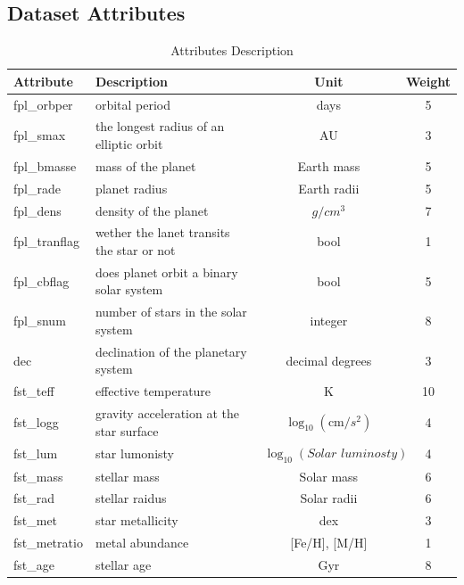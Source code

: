 \documentclass[12p]{article}
\begin{document}
\begin{landscape}
    \section{Dataset Attributes}
    \begin{table}[!h]\centering
        \caption{Attributes Description}
        \label{tab:att_desc}
        \begin{tabular}{|l l c c |}\hline
            Attribute         & Description                                         & Unit          & Weight \\ \hline\hline
            fpl\_orbper      & orbital period                                     & days            & 5 \\ \hline
            fpl\_smax        & the longest radius of an elliptic orbit    & AU             &3 \\ \hline
            fpl\_bmasse    & mass of the planet                              & Earth mass & 5 \\ \hline
            fpl\_rade         & planet radius                                       & Earth radii    & 5 \\ \hline
            fpl\_dens        & density of the planet                            & $g/cm^3$  & 7 \\ \hline
            fpl\_tranflag    & wether the lanet transits the star or not & bool          & 1 \\ \hline
            fpl\_cbflag      & does planet orbit a binary solar system  & bool           & 5 \\ \hline
            fpl\_snum       & number of stars in the solar system      & integer        & 8 \\ \hline
            dec                 & declination of the planetary system       & decimal degrees & 3 \\ \hline
            fst\_teff          & effective temperature                          & K                 & 10 \\ \hline
            fst\_logg        & gravity acceleration at the star surface  & $\log_{10}{\left( \text{cm}/s^2\right)}$ & 4 \\ \hline
            fst\_lum         & star lumonisty                                     & $\log_{10}{\left( \textit{Solar luminosty}\right)}$ & 4 \\ \hline
            fst\_mass       & stellar mass                                        & Solar mass  & 6 \\ \hline
            fst\_rad         & stellar raidus                                        & Solar radii    & 6 \\ \hline
            fst\_met        & star metallicity                                      & dex            & 3 \\ \hline
            fst\_metratio & metal abundance                                    & [Fe/H], [M/H]  & 1 \\ \hline
            fst\_age         & stellar age                                            & Gyr              & 8 \\ \hline
        \end{tabular}
    \end{table}
    

\end{landscape}
\end{document}
